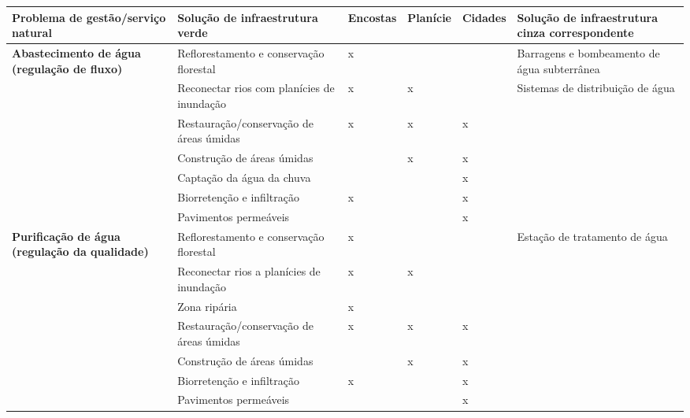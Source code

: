 \documentclass[./main.tex]{subfiles}
\begin{document}
{\renewcommand{\arraystretch}{1.5}
\begin{table}[t!]
    \centering	
    \tiny
    \sffamily
    \begin{tabular}{ 
         >{\raggedright\arraybackslash}m{2.5cm}  
         >{\raggedright\arraybackslash}m{3.5cm}  
         >{\raggedright\arraybackslash}m{1.0cm}
         >{\raggedright\arraybackslash}m{1.0cm}
         >{\raggedright\arraybackslash}m{1.0cm}
         >{\raggedright\arraybackslash}m{2.5cm}
    }
    \toprule 
    \textbf{Problema de gestão/serviço natural} & \textbf{Solução de infraestrutura verde} & \textbf{Encostas} & \textbf{Planície} & \textbf{Cidades} & \textbf{Solução de infraestrutura cinza correspondente}\\ 
    \midrule
    \textbf{Abastecimento de água (regulação de fluxo)} & Reflorestamento e conservação florestal & x &  &  & Barragens e bombeamento de água subterrânea \\
    \cline{2-5}
    & Reconectar rios com planícies de inundação & x & x &  & Sistemas de distribuição de água \\
    \cline{2-5}
    & Restauração/conservação de áreas úmidas & x & x & x &  \\
    \cline{2-5}
    & Construção de áreas úmidas &  & x & x &  \\
    \cline{2-5}
    & Captação da água da chuva &  &  & x &  \\
    \cline{2-5}
    & Biorretenção e infiltração & x &  & x &  \\
    \cline{2-5}
    & Pavimentos permeáveis &  &  & x &  \\
    
    \textbf{Purificação de água (regulação da qualidade)}& Reflorestamento e conservação florestal & x &  &  & Estação de tratamento de água \\
    \cline{2-5}
    & Reconectar rios a planícies de inundação & x & x &  &  \\
    \cline{2-5}
    & Zona ripária & x &  &  &  \\
    \cline{2-5}
    & Restauração/conservação de áreas úmidas & x & x & x &  \\
    \cline{2-5}
    & Construção de áreas úmidas &  & x & x &  \\
    \cline{2-5}
    & Biorretenção e infiltração & x &  & x &  \\
    \cline{2-5}
    & Pavimentos permeáveis &  &  & x &  \\
    

\end{tabular}
\end{table}}
\end{document}
